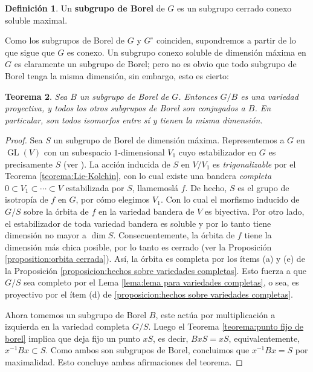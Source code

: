 \documentclass[spanish,12pt]{amsart}
\newtheorem{theorem}{Teorema}[section]
\theoremstyle{definition}
\newtheorem{definition}[theorem]{Definición}
\theoremstyle{remark}
\numberwithin{equation}{section}
\begin{document}
\begin{definition}
Un \textbf{subgrupo de Borel} de $G$ es un subgrupo cerrado conexo soluble maximal.
\end{definition}
Como los subgrupos de Borel de $G$ y $G^{\circ}$ coinciden, supondremos a partir de lo que sigue que $G$ es conexo. Un subgrupo conexo soluble de dimensión máxima en $G$ es claramente un subgrupo de Borel; pero no es obvio que todo subgrupo de Borel tenga la misma dimensión, sin embargo, esto es cierto:

\begin{theorem}\label{teorema:los subgrupos de borel son conjugados y G/B es una variedad proyectiva}
Sea $B$ un subgrupo de Borel de $G$. Entonces $G/B$ es una variedad proyectiva, y todos los otros subgrupos de Borel son conjugados a $B$. En particular, son todos isomorfos entre sí y tienen la misma dimensión.
\end{theorem}
\begin{proof}
Sea $S$ un subgrupo de Borel de dimensión máxima. Representemos a $G$ en $\operatorname{GL} (V)$ con un subespacio $1$-dimensional $V_1$ cuyo estabilizador en $G$ es precisamente $S$ (ver \cite[Teorema 11.2]{humphreys2012linearAlgebraicGroups}). La acción inducida de $S$ en $V/V_1$ es \textit{trigonalizable} por el Teorema \ref{teorema:Lie-Kolchin}, con lo cual existe una bandera \textit{completa} $0 \subset V_1 \subset \cdots \subset V$ estabilizada por $S$, llamemoslá $f$. De hecho, $S$ es el grupo de isotropía de $f$ en $G$, por cómo elegimos $V_1$. Con lo cual el morfismo inducido de $G/S$ sobre la órbita de $f$ en la variedad bandera de $V$ es biyectiva. Por otro lado, el estabilizador de toda variedad bandera es soluble y por lo tanto tiene dimensión no mayor a $\dim S$. Consecuentemente, la órbita de $f$ tiene la dimensión más chica posible, por lo tanto es cerrado (ver la Proposición \ref{proposition:orbita cerrada}). Así, la órbita es completa por los ítems (a) y (e) de la Proposición \ref{proposicion:hechos sobre variedades completas}. Esto fuerza a que $G/S$ sea completo por el Lema \ref{lema:lema para variedades completas}, o sea, es proyectivo por el ítem (d) de \ref{proposicion:hechos sobre variedades completas}.

Ahora tomemos un subgrupo de Borel $B$, este actúa por multiplicación a izquierda en la variedad completa $G/S$. Luego el Teorema \ref{teorema:punto fijo de borel} implica que deja fijo un punto $xS$, es decir, $BxS = xS$, equivalentemente, $x^{-1} B x \subset S$. Como ambos son subgrupos de Borel, concluimos que $x^{-1} B x = S$ por maximalidad. Esto concluye ambas afirmaciones del teorema.
\end{proof}
\end{document}
